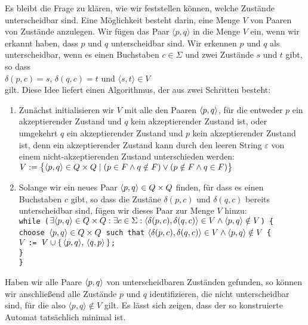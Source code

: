Es bleibt die Frage zu kl\"aren, wie wir feststellen k\"onnen, welche Zust\"ande unterscheidbar sind.
Eine M\"oglichkeit besteht darin, eine Menge $V$ von Paaren von Zust\"ande anzulegen.  Wir f\"ugen
das Paar $\langle p, q \rangle$ in die Menge $V$ ein, wenn wir erkannt haben, dass $p$ und $q$
unterscheidbar sind.  Wir erkennen $p$ und $q$ als unterscheidbar, wenn es einen Buchstaben 
$c\in\Sigma$ und zwei Zust\"ande $s$ und $t$ gibt, so dass 
\\[0.2cm]
\hspace*{1.3cm}
$\delta(p,c) = s$, $\delta(q,c) = t$ und $\langle s, t \rangle \in V$
\\[0.2cm]
gilt.  Diese Idee liefert einen Algorithmus, der aus zwei Schritten besteht:
\begin{enumerate}
\item Zun\"achst initialisieren wir $V$ mit alle den Paaren $\pair(p,q)$, f\"ur die entweder
      $p$ ein akzeptierender Zustand und $q$ kein akzeptierender Zustand ist, oder
      umgekehrt $q$ ein akzeptierender Zustand und $p$ kein akzeptierender Zustand ist,
      denn ein akzeptierender Zustand kann durch den leeren String $\varepsilon$ von einem
      nicht-akzeptierenden Zustand unterschieden werden:
      \\[0.2cm]
      \hspace*{1.3cm}
      $V := \bigl\{\pair(p,q) \in Q \times Q \mid (p \in F \wedge q \notin F) \vee 
                                               (p \notin F \wedge q \in F) \bigr\}$
\item Solange wir ein neues Paar $\pair(p,q) \in Q \times Q$ finden, f\"ur dass es einen 
      Buchstaben $c$ gibt, so dass die Zust\"ane $\delta(p,c)$ und $\delta(q,c)$ 
      bereits unterscheidbar sind, f\"ugen wir dieses Paar zur Menge $V$ hinzu: 
      \\[0.2cm]
      \hspace*{1.3cm} 
      \texttt{while ($\exists \pair(p,q) \in Q \times Q: \exists c \in \Sigma:\langle\delta(p,c),
        \delta(q,c)\rangle \in V \wedge \pair(p,q) \notin V$) \{} \\
      \hspace*{1.8cm}
      \texttt{choose $\pair(p,q) \in Q \times Q$ such that} $\langle\delta(p,c),
      \delta(q,c)\rangle \in V \wedge \pair(p,q) \notin V$ \texttt{\{}
\\
      \hspace*{2.3cm}
      \texttt{$V$ := $V \cup \{\, \pair(p,q),\, \pair(q,p)\, \}$;} \\
      \hspace*{1.8cm}
      \texttt{\}}\\
      \hspace*{1.3cm}
      \texttt{\}}
\end{enumerate}
Haben wir alle Paare $\pair(p,q)$ von unterscheidbaren Zust\"anden gefunden,
so k\"onnen wir anschlie{\ss}end alle Zust\"ande $p$ und $q$  identifizieren, die nicht
unterscheidbar sind, f\"ur die also $\langle p, q \rangle \not\in V$ gilt.
Es l\"asst sich zeigen, dass der so konstruierte Automat tats\"achlich minimal ist.
\pagebreak

